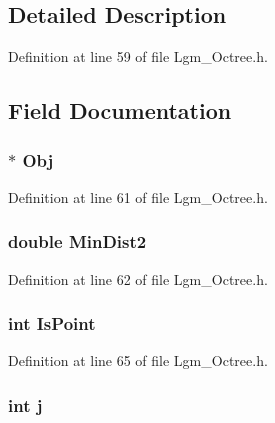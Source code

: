 \subsection{Detailed Description}


Definition at line 59 of file Lgm\_\-Octree.h.

\subsection{Field Documentation}
\hypertarget{struct__p_queue_7530efafe5945a266bf8383ae47c7228}{
\subsubsection[{Obj}]{$\ast$ {\bf Obj}}}
\label{struct__p_queue_7530efafe5945a266bf8383ae47c7228}




Definition at line 61 of file Lgm\_\-Octree.h.\hypertarget{struct__p_queue_fcb495567b98cde535c5239b17681f62}{
\subsubsection[{MinDist2}]{\setlength{\rightskip}{0pt plus 5cm}double {\bf MinDist2}}}
\label{struct__p_queue_fcb495567b98cde535c5239b17681f62}




Definition at line 62 of file Lgm\_\-Octree.h.\hypertarget{struct__p_queue_270a4dbd002743db25f63825195e4006}{
\subsubsection[{IsPoint}]{\setlength{\rightskip}{0pt plus 5cm}int {\bf IsPoint}}}
\label{struct__p_queue_270a4dbd002743db25f63825195e4006}




Definition at line 65 of file Lgm\_\-Octree.h.\hypertarget{struct__p_queue_37d972ae0b47b9099e30983131d31916}{
\subsubsection[{j}]{\setlength{\rightskip}{0pt plus 5cm}int {\bf j}}}
\label{struct__p_queue_37d972ae0b47b9099e30983131d31916}




